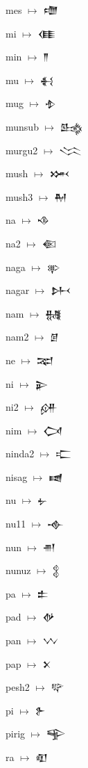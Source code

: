 {\noindent mes $\mapsto$ {\cufont 𒈩}\par
\noindent mi $\mapsto$ {\cufont 𒈪}\par
\noindent min $\mapsto$ {\cufont 𒈫}\par
\noindent mu $\mapsto$ {\cufont 𒈬}\par
\noindent mug $\mapsto$ {\cufont 𒈮}\par
\noindent munsub $\mapsto$ {\cufont 𒈰}\par
\noindent murgu2 $\mapsto$ {\cufont 𒈱}\par
\noindent mush $\mapsto$ {\cufont 𒈲}\par
\noindent mush3 $\mapsto$ {\cufont 𒈹}\par
\noindent na $\mapsto$ {\cufont 𒈾}\par
\noindent na2 $\mapsto$ {\cufont 𒈿}\par
\noindent naga $\mapsto$ {\cufont 𒉀}\par
\noindent nagar $\mapsto$ {\cufont 𒉄}\par
\noindent nam $\mapsto$ {\cufont 𒉆}\par
\noindent nam2 $\mapsto$ {\cufont 𒉇}\par
\noindent ne $\mapsto$ {\cufont 𒉈}\par
\noindent ni $\mapsto$ {\cufont 𒉌}\par
\noindent ni2 $\mapsto$ {\cufont 𒉎}\par
\noindent nim $\mapsto$ {\cufont 𒉏}\par
\noindent ninda2 $\mapsto$ {\cufont 𒉒}\par
\noindent nisag $\mapsto$ {\cufont 𒉠}\par
\noindent nu $\mapsto$ {\cufont 𒉡}\par
\noindent nu11 $\mapsto$ {\cufont 𒉢}\par
\noindent nun $\mapsto$ {\cufont 𒉣}\par
\noindent nunuz $\mapsto$ {\cufont 𒉭}\par
\noindent pa $\mapsto$ {\cufont 𒉺}\par
\noindent pad $\mapsto$ {\cufont 𒉻}\par
\noindent pan $\mapsto$ {\cufont 𒉼}\par
\noindent pap $\mapsto$ {\cufont 𒉽}\par
\noindent pesh2 $\mapsto$ {\cufont 𒉾}\par
\noindent pi $\mapsto$ {\cufont 𒉿}\par
\noindent pirig $\mapsto$ {\cufont 𒊊}\par
\noindent ra $\mapsto$ {\cufont 𒊏}\par
}
